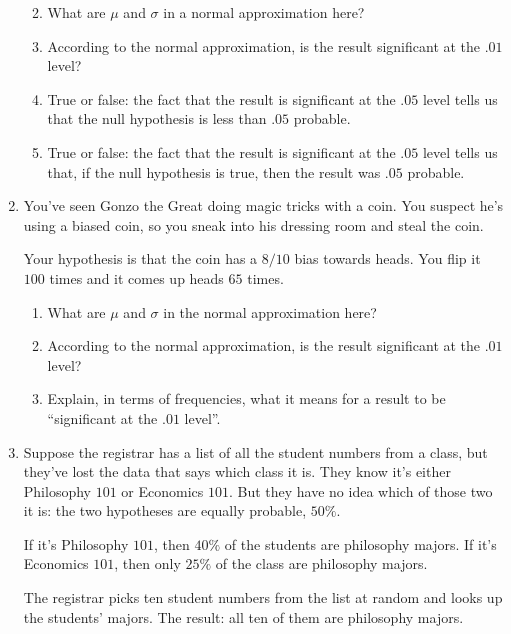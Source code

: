\documentclass[justified]{tufte-book}
\providecommand{\tightlist}{%
  \setlength{\itemsep}{0pt}\setlength{\parskip}{0pt}}
\theoremstyle{definition}
\theoremstyle{definition}
\theoremstyle{definition}
\theoremstyle{remark}
\begin{document}
\begin{enumerate}
  \begin{enumerate}
  \def\labelenumii{\alph{enumii}.}
  \tightlist
  \item
    What are \(\mu\) and \(\sigma\) in a normal approximation here?
  \item
    According to the normal approximation, is the result significant at the \(.01\) level?
  \item
    True or false: the fact that the result is significant at the \(.05\) level tells us that the null hypothesis is less than \(.05\) probable.
  \item
    True or false: the fact that the result is significant at the \(.05\) level tells us that, if the null hypothesis is true, then the result was \(.05\) probable.
  \end{enumerate}
\item
  You've seen Gonzo the Great doing magic tricks with a coin. You suspect he's using a biased coin, so you sneak into his dressing room and steal the coin.

  Your hypothesis is that the coin has a \(8/10\) bias towards heads. You flip it \(100\) times and it comes up heads \(65\) times.

  \begin{enumerate}
  \def\labelenumii{\alph{enumii}.}
  \tightlist
  \item
    What are \(\mu\) and \(\sigma\) in the normal approximation here?
  \item
    According to the normal approximation, is the result significant at the \(.01\) level?
  \item
    Explain, in terms of frequencies, what it means for a result to be ``significant at the \(.01\) level''.
  \end{enumerate}
\item
  Suppose the registrar has a list of all the student numbers from a class, but they've lost the data that says which class it is. They know it's either Philosophy \(101\) or Economics \(101\). But they have no idea which of those two it is: the two hypotheses are equally probable, \(50\%\).

  If it's Philosophy \(101\), then \(40\%\) of the students are philosophy majors. If it's Economics \(101\), then only \(25\%\) of the class are philosophy majors.

  The registrar picks ten student numbers from the list at random and looks up the students' majors. The result: all ten of them are philosophy majors.


\end{enumerate}
\end{document}
